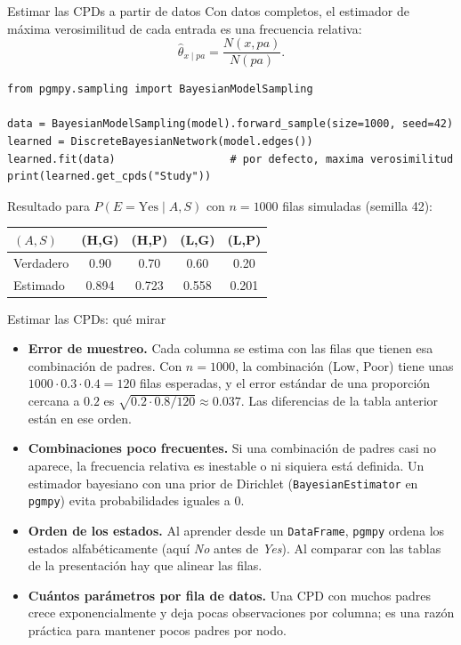 \documentclass[11pt]{beamer}
\newcommand{\Pp}[1]{P\!\left(#1\right)}
\begin{document}
\begin{frame}[fragile]{Estimar las CPDs a partir de datos}
  Con datos completos, el estimador de máxima verosimilitud de cada entrada es una frecuencia relativa:
  \[
    \hat\theta_{x\mid pa}=\frac{N(x,pa)}{N(pa)}.
  \]
\begin{lstlisting}
from pgmpy.sampling import BayesianModelSampling

data = BayesianModelSampling(model).forward_sample(size=1000, seed=42)
learned = DiscreteBayesianNetwork(model.edges())
learned.fit(data)                  # por defecto, maxima verosimilitud
print(learned.get_cpds("Study"))
\end{lstlisting}
  \small
  Resultado para $\Pp{E=\text{Yes}\mid A,S}$ con $n=1000$ filas simuladas (semilla 42):

  \begin{tabular}{lcccc}
    \toprule
    $(A,S)$ & (H,G) & (H,P) & (L,G) & (L,P) \\
    \midrule
    Verdadero & 0.90 & 0.70 & 0.60 & 0.20 \\
    Estimado  & 0.894 & 0.723 & 0.558 & 0.201 \\
    \bottomrule
  \end{tabular}
\end{frame}

\begin{frame}{Estimar las CPDs: qué mirar}
  \begin{itemize}
    \item \textbf{Error de muestreo.} Cada columna se estima con las filas que tienen esa combinación de padres. Con $n=1000$, la combinación (Low, Poor) tiene unas $1000\cdot0.3\cdot0.4=120$ filas esperadas, y el error estándar de una proporción cercana a $0.2$ es $\sqrt{0.2\cdot0.8/120}\approx0.037$. Las diferencias de la tabla anterior están en ese orden.
    \item \textbf{Combinaciones poco frecuentes.} Si una combinación de padres casi no aparece, la frecuencia relativa es inestable o ni siquiera está definida. Un estimador bayesiano con una prior de Dirichlet (\texttt{BayesianEstimator} en \texttt{pgmpy}) evita probabilidades iguales a 0.
    \item \textbf{Orden de los estados.} Al aprender desde un \texttt{DataFrame}, \texttt{pgmpy} ordena los estados alfabéticamente (aquí \emph{No} antes de \emph{Yes}). Al comparar con las tablas de la presentación hay que alinear las filas.
    \item \textbf{Cuántos parámetros por fila de datos.} Una CPD con muchos padres crece exponencialmente y deja pocas observaciones por columna; es una razón práctica para mantener pocos padres por nodo.
  \end{itemize}
\end{frame}
\end{document}
